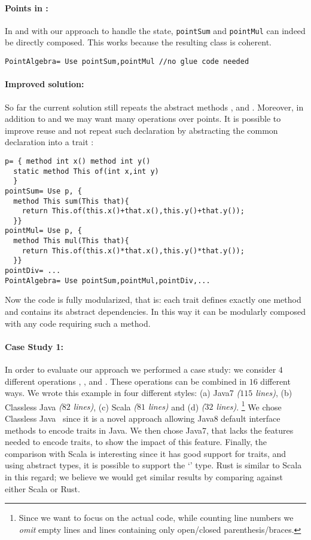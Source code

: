 \paragraph{Points in \name:}
In \name and with our approach to handle the state, 
\lstinline{pointSum} and \lstinline{pointMul} can indeed be directly composed.
This works because the resulting class is coherent.
\begin{lstlisting}
PointAlgebra= Use pointSum,pointMul //no glue code needed
\end{lstlisting}  

\paragraph{Improved solution:} So far the current solution still
  repeats the abstract methods \Q@x@, \Q@y@ and \Q@of@.
  Moreover, in addition to \Q@sum@ and \Q@mul@ we may want many
  operations over points. It is possible to improve reuse
  and not repeat such declaration by abstracting the common
  declaration into a trait \Q@p@: 
\begin{lstlisting}
p= { method int x() method int y()
  static method This of(int x,int y)
  }
pointSum= Use p, { 
  method This sum(This that){
    return This.of(this.x()+that.x(),this.y()+that.y());
  }}
pointMul= Use p, { 
  method This mul(This that){
    return This.of(this.x()*that.x(),this.y()*that.y());
  }}
pointDiv= ...
PointAlgebra= Use pointSum,pointMul,pointDiv,...
\end{lstlisting}
Now the code is fully modularized, that is: each trait defines exactly one method and contains its abstract dependencies. In this way it can be modularly composed with any code requiring such a method.

\paragraph{Case Study 1:}
In order to evaluate our approach
we performed a case study:
we consider $4$ different operations \Q@Sum@, \Q@Subtraction@, \Q@Multiplication@ and \Q@Division@.
These operations can be combined in $16$ different ways.
We wrote this example in four different styles:
(a) Java7 \emph{($115$ lines)},
(b) Classless Java \emph{($82$ lines)},
(c) Scala \emph{($81$ lines)} and (d) \name \emph{($32$ lines)}.%
\footnote{
Since we want to focus on the actual code, while counting line numbers we \emph{omit} empty lines and lines containing only open/closed
parenthesis/braces.
}
We chose Classless Java~\cite{wang2016classless} since it is a novel approach allowing
Java8 default interface methods to encode traits in Java.
We then chose Java7, that lacks the features needed to encode traits, to show the impact of this feature.
Finally, the comparison with Scala is interesting 
since
it has good support for traits, and using abstract types, it is possible to support the `\Q@This@' type.
Rust is similar to Scala in this regard; we believe we would get similar results by comparing against either Scala or Rust.

